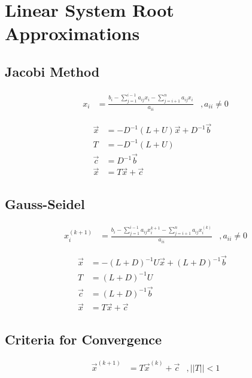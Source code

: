 \section{Linear System Root Approximations}

	\subsection{Jacobi Method}
		\begin{align}
				x_{i} &= \frac{b_{i}-\sum_{j=1}^{i-1}a_{ij}x_{i} - \sum_{j=i+1}^{n}a_{ij}x_{i}}{a_{ii}}&,a_{ii}\neq0
		\end{align}

		\begin{align}
			\vec{x} &= -D^{-1}(L+U)\vec{x} + D^{-1}\vec{b}& \\
			T &= -D^{-1}(L+U)& \\
			\vec{c} &= D^{-1}\vec{b}& \\
			\vec{x} &= T\vec{x} + \vec{c}
		\end{align}

	\subsection{Gauss-Seidel}
		\begin{align}
			x_{i}^{(k+1)} &= \frac{b_{i}-\sum_{j=1}^{i-1}a_{ij}x_{i}^{k+1} - \sum_{j=i+1}^{n}a_{ij}x_{i}^{(k)}}{a_{ii}}&,a_{ii}\neq0
		\end{align}

		\begin{align}
			\vec{x} &= -(L+D)^{-1}U\vec{x} + (L+D)^{-1}\vec{b}& \\
			T &= (L+D)^{-1}U& \\
			\vec{c} &= (L+D)^{-1}\vec{b}& \\
			\vec{x} &= T\vec{x} + \vec{c}
		\end{align}

	\subsection{Criteria for Convergence}
		\begin{align}
			\vec{x}^{(k+1)} &= T\vec{x}^{(k)} + \vec{c}&, ||T|| < 1
		\end{align}

